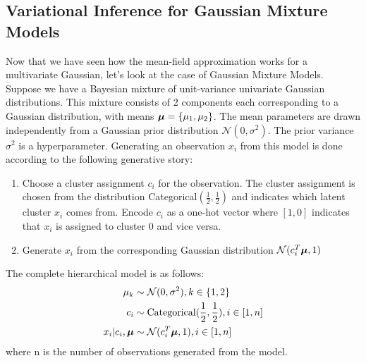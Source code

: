 \documentclass[11pt,addpoints,answers]{exam}
\numberwithin{equation}{section} %
\numberwithin{figure}{section} %
\numberwithin{table}{section} %
\begin{document}
\subsection{Variational Inference for Gaussian Mixture Models}
Now that we have seen how the mean-field approximation works for a multivariate Gaussian, let's look at the case of Gaussian Mixture Models. Suppose we have a Bayesian mixture of unit-variance univariate Gaussian distributions. This mixture consists of 2 components each corresponding to a Gaussian distribution, with means $\boldsymbol \mu = \{\mu_1,\mu_2\}$. The mean parameters are drawn independently from a Gaussian prior distribution $\mathcal{N}(0, \sigma^2)$. The prior variance $\sigma^2$ is a hyperparameter. Generating an observation $x_i$ from this model is done according to the following generative story:
\begin{enumerate}
    \item Choose a cluster assignment $c_i$ for the observation. The cluster assignment is chosen from the distribution Categorical$(\frac{1}{2}, \frac{1}{2})$ and indicates which latent cluster $x_i$ comes from. Encode $c_i$ as a one-hot vector where $[1,0]$ indicates that $x_i$ is assigned to cluster 0 and vice versa.
    \item Generate $x_i$ from the corresponding Gaussian distribution $\mathcal{N}(c_i^T\boldsymbol \mu, 1)$
\end{enumerate}
The complete hierarchical model is as follows:
\begin{align*}
    \mu_k &\sim \mathcal{N}(0, \sigma^2), k \in \{1,2\}\\
    c_i &\sim \text{Categorical}(\frac{1}{2}, \frac{1}{2}), i \in [1,n]\\
    x_i | c_i, \boldsymbol \mu &\sim \mathcal{N}(c_i^T\boldsymbol \mu, 1), i \in [1,n] 
\end{align*}
where n is the number of observations generated from the model.
\end{document}
